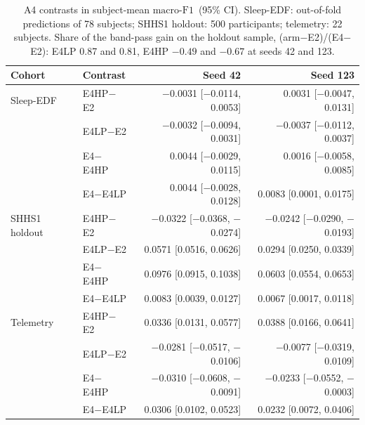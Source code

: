 \documentclass[10pt,a4paper]{article}
\newcommand{\mf}{\ensuremath{\mathrm{macro\text{-}F1}}}
\newcommand{\ci}{95\% CI}
\begin{document}
\begin{table}[H]
\centering\scriptsize
\caption{A4 contrasts in subject-mean \mf\ (\ci). Sleep-EDF: out-of-fold predictions of 78 subjects; SHHS1
holdout: 500 participants; telemetry: 22 subjects. Share of the band-pass gain on the holdout sample,
(arm$-$E2)/(E4$-$E2): E4LP 0.87 and 0.81, E4HP $-0.49$ and $-0.67$ at seeds 42 and 123.}
\label{tab:sup_a4}
\begin{tabular}{llrr}
\toprule
Cohort & Contrast & Seed 42 & Seed 123 \\
\midrule
Sleep-EDF & E4HP$-$E2 & $-$0.0031 [$-$0.0114, 0.0053] & 0.0031 [$-$0.0047, 0.0131] \\
 & E4LP$-$E2 & $-$0.0032 [$-$0.0094, 0.0031] & $-$0.0037 [$-$0.0112, 0.0037] \\
 & E4$-$E4HP & 0.0044 [$-$0.0029, 0.0115] & 0.0016 [$-$0.0058, 0.0085] \\
 & E4$-$E4LP & 0.0044 [$-$0.0028, 0.0128] & 0.0083 [0.0001, 0.0175] \\
\addlinespace
SHHS1 holdout & E4HP$-$E2 & $-$0.0322 [$-$0.0368, $-$0.0274] & $-$0.0242 [$-$0.0290, $-$0.0193] \\
 & E4LP$-$E2 & 0.0571 [0.0516, 0.0626] & 0.0294 [0.0250, 0.0339] \\
 & E4$-$E4HP & 0.0976 [0.0915, 0.1038] & 0.0603 [0.0554, 0.0653] \\
 & E4$-$E4LP & 0.0083 [0.0039, 0.0127] & 0.0067 [0.0017, 0.0118] \\
\addlinespace
Telemetry & E4HP$-$E2 & 0.0336 [0.0131, 0.0577] & 0.0388 [0.0166, 0.0641] \\
 & E4LP$-$E2 & $-$0.0281 [$-$0.0517, $-$0.0106] & $-$0.0077 [$-$0.0319, 0.0109] \\
 & E4$-$E4HP & $-$0.0310 [$-$0.0608, $-$0.0091] & $-$0.0233 [$-$0.0552, $-$0.0003] \\
 & E4$-$E4LP & 0.0306 [0.0102, 0.0523] & 0.0232 [0.0072, 0.0406] \\
\bottomrule
\end{tabular}
\end{table}
\end{document}
